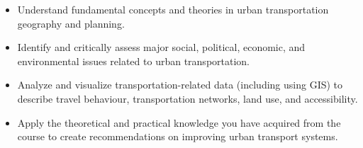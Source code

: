 \documentclass[11pt]{article}
\begin{document}
	\begin{itemize}
		
		\item Understand fundamental concepts and theories in urban transportation geography and planning.
		
		\item Identify and critically assess major social, political, economic, and environmental issues related to urban transportation.
		
		\item Analyze and visualize transportation-related data (including using GIS) to describe travel behaviour, transportation networks, land use, and accessibility.
		
		\item Apply the theoretical and practical knowledge you have acquired from the course to create recommendations on improving urban transport systems.
		
	\end{itemize}
	
	
	
	
	
	
	

	
	
	
	
%	
	
	
	
	
	
	
	
		
%		
\end{document}

